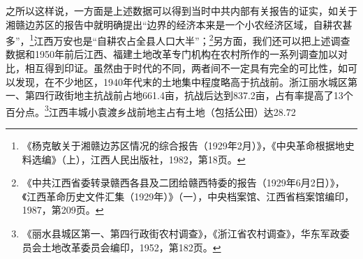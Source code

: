 之所以这样说，一方面是上述数据可以得到当时中共内部有关报告的证实，如关于湘赣边苏区的报告中就明确提出“边界的经济本来是一个小农经济区域，自耕农甚多”，\footnote{《杨克敏关于湘赣边苏区情况的综合报告（1929年2月）》，《中央革命根据地史料选编》（上），江西人民出版社，1982，第18页。}江西万安也是“自耕农占全县人口大半”；\footnote{《中共江西省委转录赣西各县及二团给赣西特委的报告（1929年6月2日）》，《江西革命历史文件汇集（1929年）》（一），中央档案馆、江西省档案馆编印，1987，第209页。}另方面，我们还可以把上述调查数据和1950年前后江西、福建土地改革专门机构在农村所作的一系列调查加以对比，相互得到印证。虽然由于时代的不同，两者间不一定具有完全的可比性，如可以发现，在不少地区，1940年代末的土地集中程度略高于抗战前。浙江丽水城区第一、第四行政街地主抗战前占地661.4亩，抗战后达到837.2亩，占有率提高了13个百分点。\footnote{《丽水县城区第一、第四行政街农村调查》，《浙江省农村调查》，华东军政委员会土地改革委员会编印，1952，第182页。}江西丰城小袁渡乡战前地主占有土地（包括公田）达28.72%


